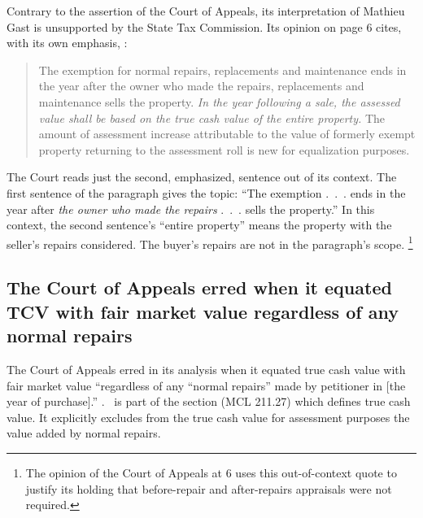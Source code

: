 \documentclass[12pt,\documentclassflag]{michiganCourtOfAppealsBrief}
\begin{document}
Contrary to the assertion of the Court of Appeals, its interpretation of Mathieu Gast is unsupported by the State Tax Commission. Its opinion on page 6 cites, with its own emphasis, :

\begin{quote}
The exemption for normal repairs, replacements and maintenance ends in the year after the
owner who made the repairs, replacements and maintenance sells the property. \emph{In the year
following a sale, the assessed value shall be based on the true cash value of the entire property.}
The amount of assessment increase attributable to the value of formerly exempt property
returning to the assessment roll is new for equalization purposes.
\end{quote}

The Court reads just the second, emphasized, sentence out of its context. The first sentence of the paragraph gives the topic: ``The exemption .~.~. ends in the year after \emph{the owner who made the repairs} .~.~. sells the property.'' In this context, the second sentence's ``entire property'' means the property with the seller's repairs considered.
The buyer's repairs are not in the paragraph's scope.%
\footnote{The opinion of the Court of Appeals at 6 uses this out-of-context quote to justify its holding that before-repair and after-repairs appraisals were not required.}

\subsection{The Court of Appeals erred when it equated TCV with fair market value regardless of any normal repairs}

The Court of Appeals erred in its analysis when it equated true cash value with fair market value ``regardless of any ``normal repairs'' made by petitioner in [the year of purchase].'' . \mathieuGast\ is part of the section (MCL 211.27) which defines true cash value. It explicitly excludes from the true cash value for assessment purposes the value added by normal repairs.
  

\end{document}
